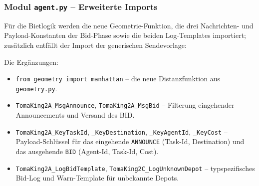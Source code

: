 
\subsubsection{Modul \texttt{agent.py} – Erweiterte Imports}

Für die Bietlogik werden die neue Geometrie-Funktion, die drei Nachrichten- und Payload-Konstanten der Bid-Phase sowie die beiden Log-Templates importiert; zusätzlich entfällt der Import der generischen Sendevorlage:

\begin{minipage}{\linewidth}
    \par\nointerlineskip
    \vspace*{-\parskip}%
    \vspace*{-\baselineskip}%
    \vspace*{-30pt}%
    \noindent
    \begin{minipage}[t]{0.49\textwidth}
        
    \end{minipage}\hfill
    \begin{minipage}[t]{0.49\textwidth}
        
    \end{minipage}%
    \vspace{-1\baselineskip}%
    \captionsetup{hypcap=false}%
    \label{lst:agent_imports_2c}%
\end{minipage}

Die Ergänzungen:
\begin{itemize}
    \item \texttt{from geometry import manhattan} -- die neue Distanzfunktion aus \texttt{geometry.py}.
    \item \texttt{TomaKing2A\_MsgAnnounce}, \texttt{TomaKing2A\_MsgBid} -- Filterung eingehender Announcements und Versand des BID.
    \item \texttt{TomaKing2A\_KeyTaskId}, \texttt{\_KeyDestination}, \texttt{\_KeyAgentId}, \texttt{\_KeyCost} -- Payload-Schlüssel für das eingehende \texttt{ANNOUNCE} (Task-Id, Destination) und das ausgehende \texttt{BID} (Agent-Id, Task-Id, Cost).
    \item \texttt{TomaKing2A\_LogBidTemplate}, \texttt{TomaKing2C\_LogUnknownDepot} -- typspezifisches Bid-Log und Warn-Template für unbekannte Depots.
\end{itemize}

